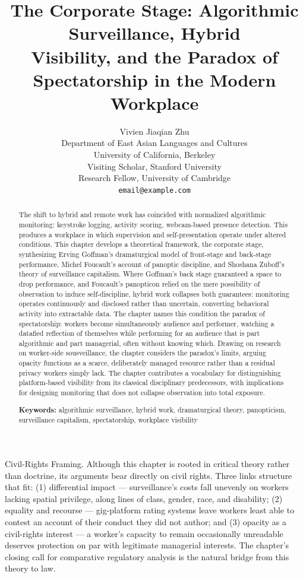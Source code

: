 \documentclass[10pt]{article}
\title{\Large\bfseries The Corporate Stage: Algorithmic Surveillance, Hybrid\\
Visibility, and the Paradox of Spectatorship in the Modern\\
Workplace}
\author{
Vivien Jiaqian Zhu\\
\small Department of East Asian Languages and Cultures\\
\small University of California, Berkeley\\
\small Visiting Scholar, Stanford University\\
\small Research Fellow, University of Cambridge\\
\small \texttt{email@example.com}
}
\date{}
\begin{document}
\maketitle

\begin{abstract}
\noindent The shift to hybrid and remote work has coincided with normalized algorithmic monitoring: keystroke logging, activity scoring, webcam-based presence detection. This produces a workplace in which supervision and self-presentation operate under altered conditions. This chapter develops a theoretical framework, the corporate stage, synthesizing Erving Goffman's dramaturgical model of front-stage and back-stage performance, Michel Foucault's account of panoptic discipline, and Shoshana Zuboff's theory of surveillance capitalism. Where Goffman's back stage guaranteed a space to drop performance, and Foucault's panopticon relied on the mere possibility of observation to induce self-discipline, hybrid work collapses both guarantees: monitoring operates continuously and disclosed rather than uncertain, converting behavioral activity into extractable data. The chapter names this condition the paradox of spectatorship: workers become simultaneously audience and performer, watching a datafied reflection of themselves while performing for an audience that is part algorithmic and part managerial, often without knowing which. Drawing on research on worker-side sousveillance, the chapter considers the paradox's limits, arguing opacity functions as a scarce, deliberately managed resource rather than a residual privacy workers simply lack. The chapter contributes a vocabulary for distinguishing platform-based visibility from its classical disciplinary predecessors, with implications for designing monitoring that does not collapse observation into total exposure.

\vspace{0.5em}
\noindent\textbf{Keywords:} algorithmic surveillance, hybrid work, dramaturgical theory, panopticism, surveillance capitalism, spectatorship, workplace visibility
\end{abstract}

\begin{callout}{Civil-Rights Framing.}
Although this chapter is rooted in critical theory rather than doctrine, its arguments bear directly on civil rights. Three links structure that fit: (1) differential impact --- surveillance's costs fall unevenly on workers lacking spatial privilege, along lines of class, gender, race, and disability; (2) equality and recourse --- gig-platform rating systems leave workers least able to contest an account of their conduct they did not author; and (3) opacity as a civil-rights interest --- a worker's capacity to remain occasionally unreadable deserves protection on par with legitimate managerial interests. The chapter's closing call for comparative regulatory analysis is the natural bridge from this theory to law.
\end{callout}
\end{document}
